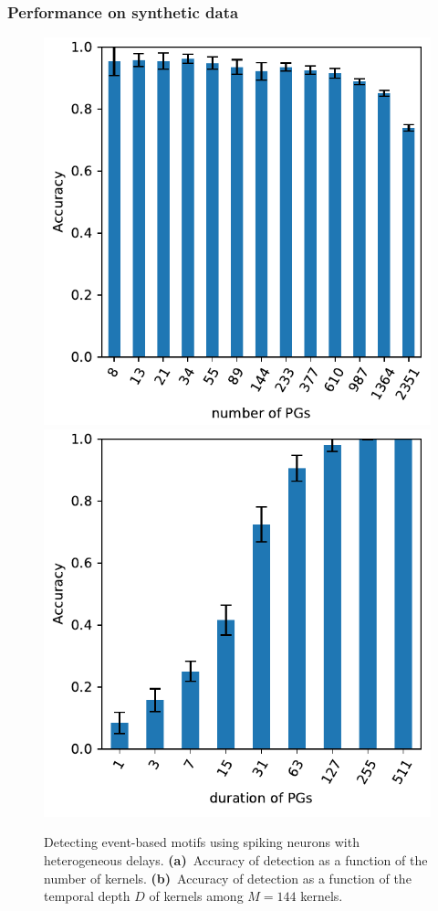 \documentclass[default]{sn-jnl}%
\theoremstyle{thmstyleone}%
\theoremstyle{thmstyletwo}%
\theoremstyle{thmstylethree}%
\begin{document}
\subsubsection{Performance on synthetic data}
%
\begin{figure}%
    \centering
    \includegraphics[width=0.490\linewidth]{figures/THC_N_PGs.pdf}
    \includegraphics[width=0.490\linewidth]{figures/THC_N_PG_time.pdf}
	    \caption{Detecting event-based motifs using spiking neurons with heterogeneous delays. 
	    {\bf (a)}~Accuracy of detection as a function of the number of kernels.
	    {\bf (b)}~Accuracy of detection as a function of the temporal depth $D$ of kernels among $M=144$ kernels.
	    }
    \label{fig:model_results}
\end{figure}
\end{document}
